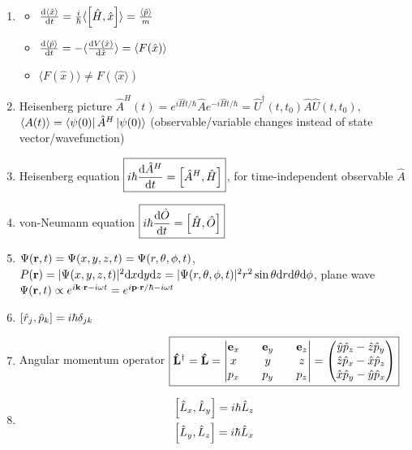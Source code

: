 \documentclass{article}
\theoremstyle{remark}
\theoremstyle{remark}
\begin{document}
\begin{enumerate}
    \item \begin{itemize}
        \item $\dv{\langle \hat{x}\rangle}{t}=\frac{i}{\hbar}\langle\comm{\hat{H}}{\hat{x}}\rangle=\frac{\langle \hat{p}\rangle}{m}$
        \item $\dv{\langle\hat{p}\rangle}{t}=-\langle\dv{V(\hat{x})}{\hat{x}}\rangle=\langle F(\hat{x})\rangle$
        \item $\langle F(\hat{x})\rangle\neq F(\langle\hat{x}\rangle)$
    \end{itemize}
    \item Heisenberg picture $\hat{A}^H(t)=e^{i\hat{H}t/\hbar}\hat{A}e^{-i\hat{H}t/\hbar} = \hat{U}^\dagger(t,t_0)\hat{A}\hat{U}(t,t_0)$, $\langle A(t)\rangle=\bra{\psi(0)}\hat{A}^H\ket{\psi(0)}$ (observable/variable changes instead of state vector/wavefunction)
    \item Heisenberg equation $\boxed{i\hbar\dv{\hat{A}^H}{t}=\comm{\hat{A}^H}{\hat{H}}}$, for time-independent observable $\hat{A}$
    \item von-Neumann equation $\boxed{i\hbar\dv{\hat{O}}{t}=\comm{\hat{H}}{\hat{O}}}$
    \item $\Psi(\vb{r},t)=\Psi(x,y,z,t)=\Psi(r,\theta,\phi,t)$, $P(\vb{r})=|\Psi(x,y,z,t)|^2\dd x\dd y\dd z=|\Psi(r,\theta,\phi,t)|^2r^2\sin\theta\dd r\dd\theta\dd\phi$, plane wave $\Psi(\vb{r},t)\propto e^{i\vb{k}\cdot\vb{r}-i\omega t}=e^{i\vb{p}\cdot\vb{r}/\hbar-i\omega t}$
    \item $\comm{\hat{r}_j}{\hat{p}_k}=i\hbar\delta_{jk}$
    \item Angular momentum operator $\boxed{\vb{\hat{L}}^\dagger=\vb{\hat{L}}=\begin{vmatrix}
        \vb{e}_x && \vb{e}_y && \vb{e}_z\\
        x && y && z\\
        p_x && p_y && p_z
    \end{vmatrix} = \begin{pmatrix}
        \hat{y}\hat{p}_z-\hat{z}\hat{p}_y\\
        \hat{z}\hat{p}_x-\hat{x}\hat{p}_z\\
        \hat{x}\hat{p}_y-\hat{y}\hat{p}_x
    \end{pmatrix}}$
    \item \begin{align*}
        \comm{\hat{L}_x}{\hat{L}_y}=i\hbar\hat{L}_z\\
        \comm{\hat{L}_y}{\hat{L}_z}=i\hbar\hat{L}_x\\

\end{align*}
\end{enumerate}
\end{document}
